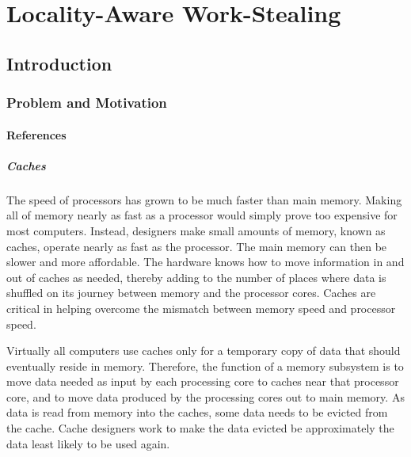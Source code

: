 
\part{Locality-Aware Work-Stealing}
\label{part:locality}

\chapter{Introduction}
\label{chap:locality-introduction}

\section{Problem and Motivation}
\label{sec:locality-intro-problem-and-motivation}


\subsection{References}

\subsubsection{Caches}

The speed of processors has grown to be much faster than main
memory. Making all of memory nearly as fast as a processor would
simply prove too expensive for most computers. Instead, designers make
small amounts of memory, known as caches, operate nearly as fast as
the processor. The main memory can then be slower and more
affordable. The hardware knows how to move information in and out of
caches as needed, thereby adding to the number of places where data is
shuffled on its journey between memory and the processor cores. Caches
are critical in helping overcome the mismatch between memory speed and
processor speed.

Virtually all computers use caches only for a temporary copy of data
that should eventually reside in memory. Therefore, the function of a
memory subsystem is to move data needed as input by each processing
core to caches near that processor core, and to move data produced by
the processing cores out to main memory. As data is read from memory
into the caches, some data needs to be evicted from the cache. Cache
designers work to make the data evicted be approximately the data
least likely to be used again.

